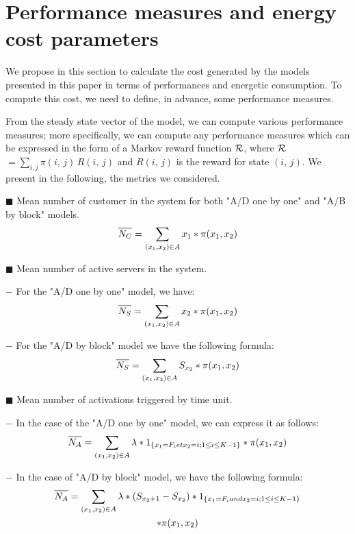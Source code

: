 \documentclass[conference]{IEEEtran}
\begin{document}
\section{Performance measures and energy cost parameters}
\label{sec:ParamPerf}

 We propose in this section to calculate the cost generated by the models presented in this paper in terms of performances and energetic consumption. To compute this cost, we need to define, in advance, some performance measures.

From the steady state vector of the model, we can compute various performance measures; more specifically, we can compute any performance measures which can be expressed in the form of a Markov reward function $\cal{R}$, where $\cal{R}$ $=\sum_{i,j}\pi(i,\,j) \,R(i,\,j)$  and $R(i,\,j)$ is the reward for state $(i,\,j)$.
 We present in the following, the metrics we considered.


  $\blacksquare$ Mean number of customer  in the system for both "A/D one by one"  and "A/B by block" models.
\begin{equation}
\overline{\mathstrut N_{C}}=\sum_{(x_{1},x_{2}) \in A}x_{1}*\pi(x_{1},x_{2})
\end{equation}

$\blacksquare$ Mean number of active servers in the system.

 $-$ For the  "A/D one by one" model, we have:
\begin{equation}
\overline{\mathstrut N_{S}}=\sum_{(x_{1},x_{2}) \in A}x_{2}*\pi(x_{1},x_{2})
\end{equation}

$-$ For the  "A/D by block" model we have the following formula:
\begin{equation}
\overline{\mathstrut N_{S}}=\sum_{(x_{1},x_{2}) \in A}S_{x_{2}}*\pi(x_{1},x_{2})
\end{equation}

$\blacksquare$ Mean number of activations triggered by time unit.

 $-$ In the case of the "A/D one by one" model, we can express it as follows:
\begin{multline}
\overline{\mathstrut N_{A}}=\sum_{(x_{1},x_{2}) \in A}\lambda*1_{\{x_{1}=F_{i} \mbox{ et } x_{2}=i \mbox{ ; } 1 \leq i \leq K-1\}}*\pi(x_{1},x_{2})
\end{multline}

 $-$ In the case of  "A/D by block" model, we have the following formula:
\begin{multline}
\overline{\mathstrut N_{A}}=\sum_{(x_{1},x_{2}) \in A}\lambda*(S_{x_2+1}-S_{x_2})*1_{\{x_{1}=F_{i} \mbox{ and } x_{2}=i \mbox{ ; } 1 \leq i \leq K-1\}}\\
*\pi(x_{1},x_{2})
\end{multline}
\end{document}
